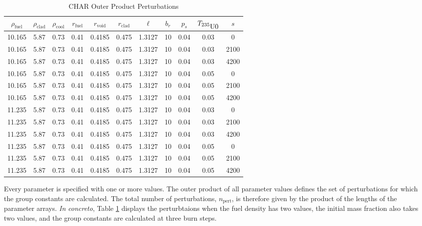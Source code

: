 \begin{table}[htbp]
\begin{center}
\caption{CHAR Outer Product Perturbations}
\label{char_param_outer_product}
\begin{tabular}{|ccccccccccc|}
\hline
\textbf{$\rho_{\mbox{fuel}}$} & \textbf{$\rho_{\mbox{clad}}$} & \textbf{$\rho_{\mbox{cool}}$} & \textbf{$r_{\mbox{fuel}}$} & \textbf{$r_{\mbox{void}}$} & \textbf{$r_{\mbox{clad}}$} & \textbf{$\ell$} & \textbf{$b_r$} & \textbf{$p_s$} & \textbf{$T_{\mbox{\nuc{U}{235}0}}$} & \textbf{$s$} \\
\hline
10.165 & 5.87 & 0.73 & 0.41 & 0.4185 & 0.475 & 1.3127 & 10 & 0.04 & 0.03 & 0    \\ 
10.165 & 5.87 & 0.73 & 0.41 & 0.4185 & 0.475 & 1.3127 & 10 & 0.04 & 0.03 & 2100 \\ 
10.165 & 5.87 & 0.73 & 0.41 & 0.4185 & 0.475 & 1.3127 & 10 & 0.04 & 0.03 & 4200 \\ 
10.165 & 5.87 & 0.73 & 0.41 & 0.4185 & 0.475 & 1.3127 & 10 & 0.04 & 0.05 & 0    \\ 
10.165 & 5.87 & 0.73 & 0.41 & 0.4185 & 0.475 & 1.3127 & 10 & 0.04 & 0.05 & 2100 \\ 
10.165 & 5.87 & 0.73 & 0.41 & 0.4185 & 0.475 & 1.3127 & 10 & 0.04 & 0.05 & 4200 \\ 
11.235 & 5.87 & 0.73 & 0.41 & 0.4185 & 0.475 & 1.3127 & 10 & 0.04 & 0.03 & 0    \\ 
11.235 & 5.87 & 0.73 & 0.41 & 0.4185 & 0.475 & 1.3127 & 10 & 0.04 & 0.03 & 2100 \\ 
11.235 & 5.87 & 0.73 & 0.41 & 0.4185 & 0.475 & 1.3127 & 10 & 0.04 & 0.03 & 4200 \\ 
11.235 & 5.87 & 0.73 & 0.41 & 0.4185 & 0.475 & 1.3127 & 10 & 0.04 & 0.05 & 0    \\ 
11.235 & 5.87 & 0.73 & 0.41 & 0.4185 & 0.475 & 1.3127 & 10 & 0.04 & 0.05 & 2100 \\ 
11.235 & 5.87 & 0.73 & 0.41 & 0.4185 & 0.475 & 1.3127 & 10 & 0.04 & 0.05 & 4200 \\ 
\hline
\end{tabular}
\end{center}
\end{table}

Every parameter is specified with one or more values.  The outer product of all parameter
values defines the set of perturbations for which the group constants are calculated.
The total number of perturbations, $n_{\mbox{pert}}$, is therefore given by the product of 
the lengths of the parameter arrays.  \emph{In concreto}, Table \ref{char_param_outer_product} 
displays the perturbtaions when the fuel density has two values, the initial  mass 
fraction also takes two values, and the group constants are calculated at three burn steps.

